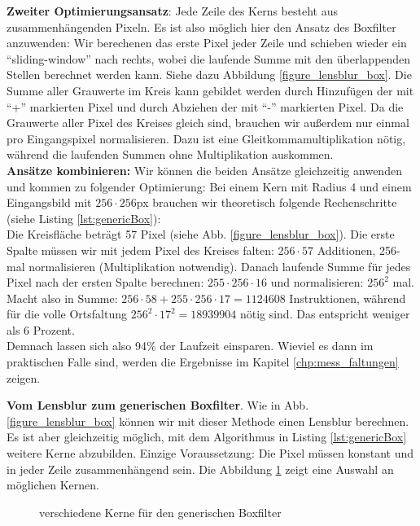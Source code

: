 \documentclass[a4paper,12pt]{article}
\begin{document}
\textbf{Zweiter Optimierungsansatz}: Jede Zeile des Kerns besteht aus
zusammenhängenden Pixeln. Es ist also möglich hier den Ansatz des Boxfilter 
anzuwenden: Wir berechenen das erste Pixel jeder Zeile und schieben wieder ein
"`sliding-window"' nach rechts, wobei die laufende Summe mit den überlappenden
Stellen berechnet werden kann. Siehe dazu Abbildung \ref{figure_lensblur_box}.
Die Summe aller Grauwerte im Kreis kann gebildet werden durch Hinzufügen der
mit "`+"' markierten Pixel und durch Abziehen der mit "`-"' markierten Pixel. Da die
Grauwerte aller Pixel des Kreises gleich sind, brauchen wir außerdem nur einmal
pro Eingangspixel normalisieren. Dazu ist eine Gleitkommamultiplikation nötig,
während die laufenden Summen ohne Multiplikation auskommen.\\
\textbf{Ansätze kombinieren:} Wir können die beiden Ansätze gleichzeitig
anwenden und kommen zu folgender Optimierung: Bei einem Kern mit Radius 4 und einem
Eingangsbild mit $256 \cdot 256$px brauchen wir theoretisch folgende
Rechenschritte (siehe Listing \ref{lst:genericBox}):
\\
Die Kreisfläche beträgt 57 Pixel (siehe Abb. \ref{figure_lensblur_box}).
Die erste Spalte müssen wir mit jedem Pixel des Kreises falten: $256 \cdot 57$
Additionen, 256-mal normalisieren (Multiplikation notwendig). Danach laufende
Summe für jedes Pixel nach der ersten Spalte berechnen: $255 \cdot 256 \cdot 16$
und normalisieren: $256^{2}$ mal. Macht also in Summe: $256 \cdot 58+255
\cdot 256 \cdot 17 = 1124608$ Instruktionen, während für die volle Ortsfaltung
$256^{2} \cdot 17^{2} = 18939904$ nötig sind. Das entspricht weniger als 6
Prozent.\\
Demnach lassen sich also 94\% der Laufzeit einsparen. Wieviel es dann im
praktischen Falle sind, werden die Ergebnisse im Kapitel
\ref{chp:mess_faltungen} zeigen.
 



\textbf{Vom Lensblur zum generischen Boxfilter}. Wie in Abb.
\ref{figure_lensblur_box} können wir mit dieser Methode einen Lensblur
berechnen. Es ist aber gleichzeitig möglich, mit dem Algorithmus in Listing
\ref{lst:genericBox} weitere Kerne abzubilden. Einzige Voraussetzung: Die Pixel
müssen konstant und in jeder Zeile zusammenhängend sein. Die Abbildung
\ref{figure_genBox} zeigt eine Auswahl an möglichen Kernen.


\begin{figure}[htbp]
\caption{verschiedene Kerne für den generischen Boxfilter}
\label{figure_genBox}
\end{figure}
 
\end{document}
